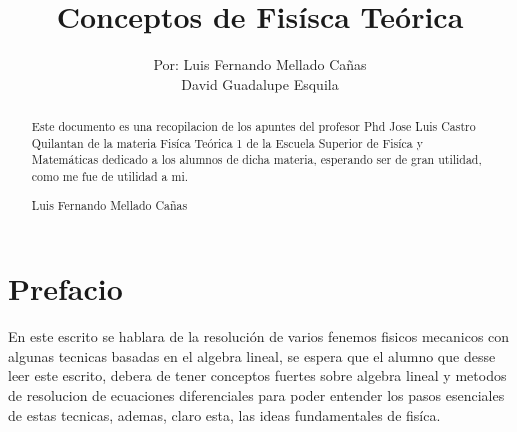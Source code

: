 \documentclass[12pt,a4paper]{article}
\author{Por: Luis Fernando Mellado Cañas\\David Guadalupe Esquila}
\title{Conceptos de Fisísca Teórica}
\date{}
\begin{document}
\maketitle
\newpage
\begin{abstract}
Este documento es una recopilacion de los apuntes del profesor Phd Jose Luis Castro Quilantan de la materia Fisíca Teórica 1 de la Escuela Superior de Fisíca y Matemáticas dedicado a los alumnos de dicha materia, esperando ser de gran utilidad, como me fue de utilidad a mi.
\begin{flushright}
Luis Fernando Mellado Cañas
\end{flushright}
\end{abstract}
\afterpage{\thispagestyle{empty}\null\newpage}
\newpage
\tableofcontents
\newpage
\section{Prefacio}
En este escrito se hablara de la resolución de varios fenemos fisicos mecanicos con algunas tecnicas basadas en el algebra lineal, se espera que el alumno que desse leer este escrito, debera de tener conceptos fuertes sobre algebra lineal y metodos de resolucion de ecuaciones diferenciales para poder entender los pasos esenciales de estas tecnicas, ademas, claro esta, las ideas fundamentales de fisíca.
\newpage
\end{document}
